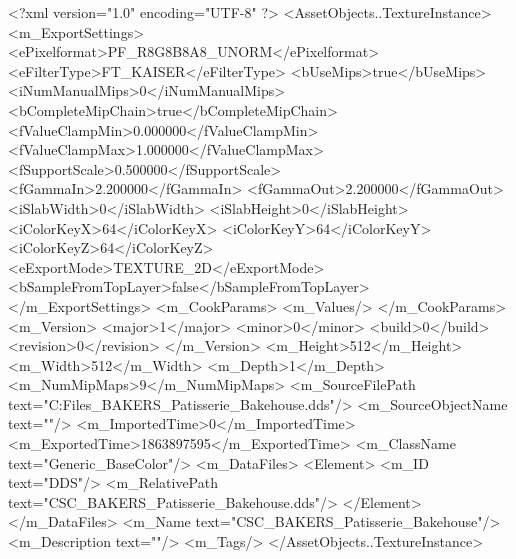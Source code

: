 <?xml version="1.0" encoding="UTF-8" ?>
<AssetObjects..TextureInstance>
	<m_ExportSettings>
		<ePixelformat>PF_R8G8B8A8_UNORM</ePixelformat>
		<eFilterType>FT_KAISER</eFilterType>
		<bUseMips>true</bUseMips>
		<iNumManualMips>0</iNumManualMips>
		<bCompleteMipChain>true</bCompleteMipChain>
		<fValueClampMin>0.000000</fValueClampMin>
		<fValueClampMax>1.000000</fValueClampMax>
		<fSupportScale>0.500000</fSupportScale>
		<fGammaIn>2.200000</fGammaIn>
		<fGammaOut>2.200000</fGammaOut>
		<iSlabWidth>0</iSlabWidth>
		<iSlabHeight>0</iSlabHeight>
		<iColorKeyX>64</iColorKeyX>
		<iColorKeyY>64</iColorKeyY>
		<iColorKeyZ>64</iColorKeyZ>
		<eExportMode>TEXTURE_2D</eExportMode>
		<bSampleFromTopLayer>false</bSampleFromTopLayer>
	</m_ExportSettings>
	<m_CookParams>
		<m_Values/>
	</m_CookParams>
	<m_Version>
		<major>1</major>
		<minor>0</minor>
		<build>0</build>
		<revision>0</revision>
	</m_Version>
	<m_Height>512</m_Height>
	<m_Width>512</m_Width>
	<m_Depth>1</m_Depth>
	<m_NumMipMaps>9</m_NumMipMaps>
	<m_SourceFilePath text="C:\Users\Shadow\Desktop\Working Files\Textures\CSC_BAKERS_Patisserie_Bakehouse.dds"/>
	<m_SourceObjectName text=""/>
	<m_ImportedTime>0</m_ImportedTime>
	<m_ExportedTime>1863897595</m_ExportedTime>
	<m_ClassName text="Generic_BaseColor"/>
	<m_DataFiles>
		<Element>
			<m_ID text="DDS"/>
			<m_RelativePath text="CSC_BAKERS_Patisserie_Bakehouse.dds"/>
		</Element>
	</m_DataFiles>
	<m_Name text="CSC_BAKERS_Patisserie_Bakehouse"/>
	<m_Description text=""/>
	<m_Tags/>
</AssetObjects..TextureInstance>

